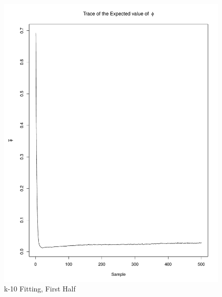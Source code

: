 \documentclass[11pt]{labbook}
\begin{document}
    \begin{figure}
        \centering
        \includegraphics[scale=.65]{FONSE_Plots/2016/December_14/k-100_expectedPhi500}
        \caption{k-10 Fitting, First Half}
        \label{fig:k-100_1EPHI}
    \end{figure}
\end{document}
